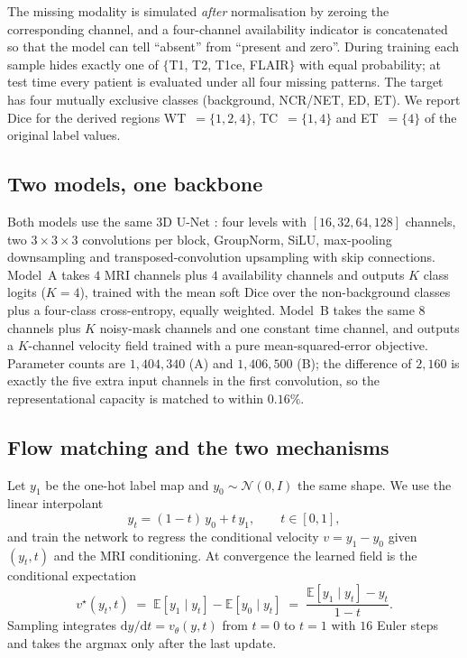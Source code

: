 \documentclass[conference]{IEEEtran}
\begin{document}
The missing modality is simulated \emph{after} normalisation by zeroing the
corresponding channel, and a four-channel availability indicator is concatenated
so that the model can tell ``absent'' from ``present and zero''. During training
each sample hides exactly one of $\{$T1, T2, T1ce, FLAIR$\}$ with equal
probability; at test time every patient is evaluated under all four missing
patterns. The target has four mutually exclusive classes (background,
NCR/NET, ED, ET). We report Dice for the derived regions
WT~$=\{1,2,4\}$, TC~$=\{1,4\}$ and ET~$=\{4\}$ of the original label values.

\subsection{Two models, one backbone}

Both models use the same 3D U-Net \cite{cicek20163dunet}: four levels with
$[16,32,64,128]$ channels,
two $3\times3\times3$ convolutions per block, GroupNorm, SiLU, max-pooling
downsampling and transposed-convolution upsampling with skip connections.
Model~A takes $4$ MRI channels plus $4$ availability channels and outputs
$K$ class logits ($K=4$), trained with the mean soft Dice over the
non-background classes plus a four-class cross-entropy, equally weighted.
Model~B takes the same $8$ channels plus $K$ noisy-mask channels and one
constant time channel, and outputs a $K$-channel velocity field trained with a
pure mean-squared-error objective. Parameter counts are $1{,}404{,}340$ (A) and
$1{,}406{,}500$ (B); the difference of $2{,}160$ is exactly the five extra input
channels in the first convolution, so the representational capacity is matched
to within $0.16\%$.

\subsection{Flow matching and the two mechanisms}
\label{sec:mechanism}

Let $y_1$ be the one-hot label map and $y_0 \sim \mathcal{N}(0, I)$ the same
shape. We use the linear interpolant
\begin{equation}
y_t = (1-t)\, y_0 + t\, y_1, \qquad t \in [0,1],
\end{equation}
and train the network to regress the conditional velocity
$v = y_1 - y_0$ given $(y_t, t)$ and the MRI conditioning. At convergence the
learned field is the conditional expectation
\begin{equation}
v^\star(y_t, t) \;=\; \mathbb{E}[y_1 \mid y_t] - \mathbb{E}[y_0 \mid y_t]
\;=\; \frac{\mathbb{E}[y_1 \mid y_t] - y_t}{1-t}.
\label{eq:vstar}
\end{equation}
Sampling integrates $\mathrm{d}y/\mathrm{d}t = v_\theta(y,t)$ from $t=0$ to
$t=1$ with $16$ Euler steps and takes the argmax only after the last update.
\end{document}
